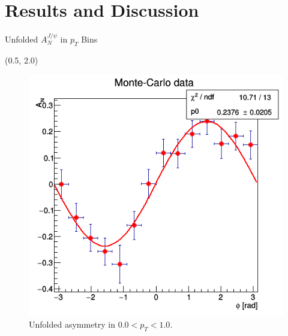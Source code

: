 \documentclass[11pt, xcolor={dvipsnames}, aspectratio = 169]{beamer}
\begin{document}
%
%
\section{Results and Discussion}


\begin{frame}{Unfolded $A^{J/\psi}_{N}$ in $p_{T}$ Bins}

\begin{textblock}{7.0}(0.5, 2.0)
\begin{figure}
    \centering
    \includegraphics[width = 1.0\linewidth]{imgs/sigal_asym0.png}
    \caption{Unfolded asymmetry in $0.0 < p_{T} < 1.0$.}
\end{figure}
\end{textblock}


\end{frame}
\end{document}
